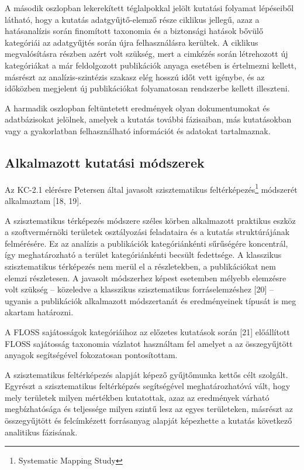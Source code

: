 \documentclass[12pt,magyar,a4paper,oneside]{scrreprt}
\begin{document}
A második oszlopban lekerekített téglalpokkal jelölt kutatási folyamat
lépéseiből látható, hogy a kutatás adatgyűjtő-elemző része ciklikus
jellegű, azaz a hatásanalízis során finomított taxonomia és a biztonsági
hatások bővülő kategóriái az adatgyűjtés során újra felhasználásra
kerültek. A ciklikus megvalósításra részben azért volt szükség, mert a
cimkézés során létrehozott új kategóriákat a már feldolgozott
publikációk anyaga esetében is értelmezni kellett, másrészt az
analízis-szintézis szakasz elég hosszú időt vett igénybe, és az
időközben megjelent új publikációkat folyamatosan rendszerbe kellett
illeszteni.

A harmadik oszlopban feltüntetett eredmények olyan dokumentumokat és
adatbázisokat jelölnek, amelyek a kutatás további fázisaiban, más
kutatásokban vagy a gyakorlatban felhasználható információt és adatokat
tartalmaznak.

\hypertarget{alkalmazott-kutatuxe1si-muxf3dszerek}{%
\subsection{Alkalmazott kutatási
módszerek}\label{alkalmazott-kutatuxe1si-muxf3dszerek}}

Az KC-2.1 elérésre Petersen által javasolt szisztematikus
feltérképezés\footnote{Systematic Mapping Study} módszerét alkalmaztam
{[}18, 19{]}.

A szisztematikus térképezés módszere széles körben alkalmazott praktikus
eszköz a szoftvermérnöki területek osztályozási feladataira és a kutatás
struktúrájának felmérésére. Ez az analízis a publikációk kategóriánkénti
sűrűségére koncentrál, így meghatározható a terület kategóriánkénti
becsült fedettsége. A klasszikus szisztematikus térképezés nem merül el
a részletekben, a publikációkat nem elemzi részletesen. A javasolt
módszerhez képest esetemben mélyebb elemzésre volt szükség -- közeledve
a klasszikus szisztematikus forráselemzéshez {[}20{]} -- ugyanis a
publikációk alkalmazott módszertanát és eredményeinek típusát is meg
akartam határozni.

A FLOSS sajátosságok kategóriáihoz az előzetes kutatások során {[}21{]}
előállított FLOSS sajátosság taxonomia vázlatot használtam fel amelyet a
az összegyűjtött anyagok segítségével fokozatosan pontosítottam.

A szisztematikus feltérképezés alapját képező gyűjtőmunka kettős célt
szolgált. Egyrészt a szisztematikus feltérképzés segítségével
meghatározhatóvá vált, hogy mely területek milyen mértékben kutatottak,
azaz az eredmények várható megbízhatósága és teljessége milyen szintű
lesz az egyes területeken, másrészt az összegyűjtött és felcímkézett
forrásanyag alapját képezhette a kutatás következő analitikus fázisának.
\end{document}
